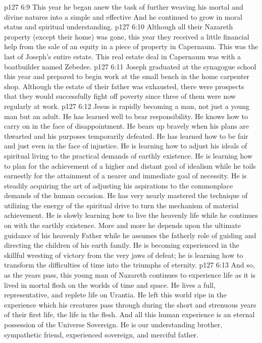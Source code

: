 \vs p127 6:9 This year he began anew the task of further weaving his mortal and divine natures into a simple and effective  And he continued to grow in moral status and spiritual understanding.
\vs p127 6:10 Although all their Nazareth property (except their home) was gone, this year they received a little financial help from the sale of an equity in a piece of property in Capernaum. This was the last of Joseph’s entire estate. This real estate deal in Capernaum was with a boatbuilder named Zebedee.
\vs p127 6:11 Joseph graduated at the synagogue school this year and prepared to begin work at the small bench in the home carpenter shop. Although the estate of their father was exhausted, there were prospects that they would successfully fight off poverty since three of them were now regularly at work.
\pc \vs p127 6:12 Jesus is rapidly becoming a man, not just a young man but an adult. He has learned well to bear responsibility. He knows how to carry on in the face of disappointment. He bears up bravely when his plans are thwarted and his purposes temporarily defeated. He has learned how to be fair and just even in the face of injustice. He is learning how to adjust his ideals of spiritual living to the practical demands of earthly existence. He is learning how to plan for the achievement of a higher and distant goal of idealism while he toils earnestly for the attainment of a nearer and immediate goal of necessity. He is steadily acquiring the art of adjusting his aspirations to the commonplace demands of the human occasion. He has very nearly mastered the technique of utilizing the energy of the spiritual drive to turn the mechanism of material achievement. He is slowly learning how to live the heavenly life while he continues on with the earthly existence. More and more he depends upon the ultimate guidance of his heavenly Father while he assumes the fatherly role of guiding and directing the children of his earth family. He is becoming experienced in the skillful wresting of victory from the very jaws of defeat; he is learning how to transform the difficulties of time into the triumphs of eternity.
\pc \vs p127 6:13 And so, as the years pass, this young man of Nazareth continues to experience life as it is lived in mortal flesh on the worlds of time and space. He lives a full, representative, and replete life on Urantia. He left this world ripe in the experience which his creatures pass through during the short and strenuous years of their first life, the life in the flesh. And all this human experience is an eternal possession of the Universe Sovereign. He is our understanding brother, sympathetic friend, experienced sovereign, and merciful father.
